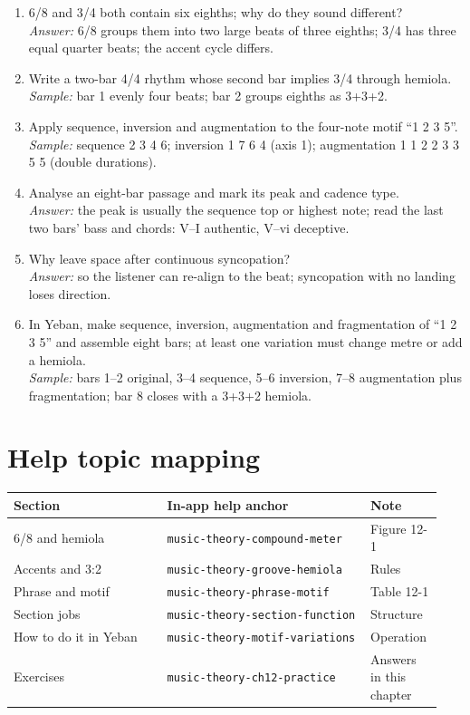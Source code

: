 \begin{exercise}
\begin{enumerate}
  \item 6/8 and 3/4 both contain six eighths; why do they sound different?\\
  \emph{Answer:} 6/8 groups them into two large beats of three eighths; 3/4 has three equal quarter beats; the accent cycle differs.
  \item Write a two-bar 4/4 rhythm whose second bar implies 3/4 through hemiola.\\
  \emph{Sample:} bar 1 evenly four beats; bar 2 groups eighths as 3+3+2.
  \item Apply sequence, inversion and augmentation to the four-note motif ``1 2 3 5''.\\
  \emph{Sample:} sequence 2 3 4 6; inversion 1 7 6 4 (axis 1); augmentation 1 1 2 2 3 3 5 5 (double durations).
  \item Analyse an eight-bar passage and mark its peak and cadence type.\\
  \emph{Answer:} the peak is usually the sequence top or highest note; read the last two bars' bass and chords: V--I authentic, V--vi deceptive.
  \item Why leave space after continuous syncopation?\\
  \emph{Answer:} so the listener can re-align to the beat; syncopation with no landing loses direction.
  \item In Yeban, make sequence, inversion, augmentation and fragmentation of ``1 2 3 5'' and assemble eight bars; at least one variation must change metre or add a hemiola.\\
  \emph{Sample:} bars 1--2 original, 3--4 sequence, 5--6 inversion, 7--8 augmentation plus fragmentation; bar 8 closes with a 3+3+2 hemiola.
\end{enumerate}
\end{exercise}

\section{Help topic mapping}
\begin{center}
\footnotesize
\setlength{\tabcolsep}{3pt}
\begin{longtable}{p{0.34\linewidth}p{0.45\linewidth}p{0.15\linewidth}}
\toprule
Section & In-app help anchor & Note \\
\midrule
\endhead
6/8 and hemiola & \texttt{music-theory-compound-meter} & Figure 12-1 \\
Accents and 3:2 & \texttt{music-theory-groove-hemiola} & Rules \\
Phrase and motif & \texttt{music-theory-phrase-motif} & Table 12-1 \\
Section jobs & \texttt{music-theory-section-function} & Structure \\
How to do it in Yeban & \texttt{music-theory-motif-variations} & Operation \\
Exercises & \texttt{music-theory-ch12-practice} & Answers in this chapter \\
\bottomrule
\end{longtable}
\end{center}

